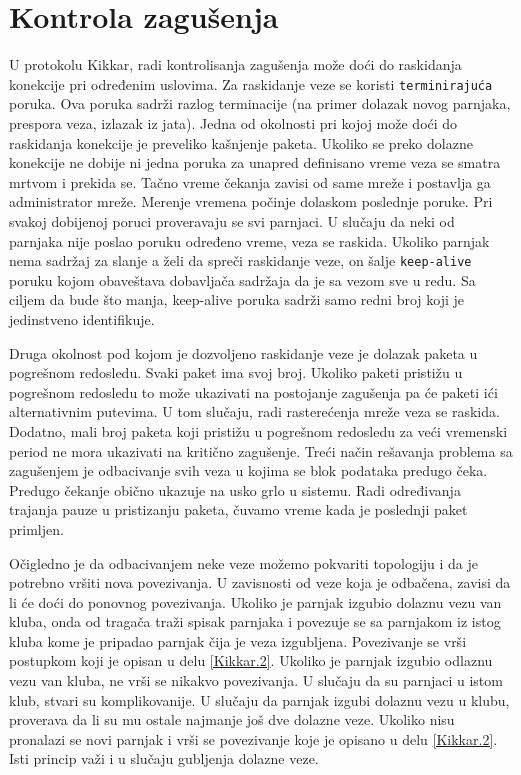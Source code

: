 \documentclass[12pt,oneside]{memoir}
\begin{document}
 
\section{Kontrola zagušenja}
\label{Kikkar.4}

U protokolu Kikkar, radi kontrolisanja zagušenja može doći do raskidanja konekcije pri određenim uslovima. Za raskidanje veze se koristi \texttt{terminirajuća} poruka. Ova poruka sadrži razlog terminacije (na primer dolazak novog parnjaka, prespora veza, izlazak iz jata). Jedna od okolnosti pri kojoj može doći do raskidanja konekcije je preveliko kašnjenje paketa. Ukoliko se preko dolazne konekcije ne dobije ni jedna poruka za unapred definisano vreme veza se smatra mrtvom i prekida se. Tačno vreme čekanja zavisi od same mreže i postavlja ga administrator mreže. Merenje vremena počinje dolaskom poslednje poruke. Pri svakoj dobijenoj poruci proveravaju se svi parnjaci. U slučaju da neki od parnjaka nije poslao poruku određeno vreme, veza se raskida. Ukoliko parnjak nema sadržaj za slanje a želi da spreči raskidanje veze, on šalje \texttt{keep-alive} poruku kojom obaveštava dobavljača sadržaja da je sa vezom sve u redu. Sa ciljem da bude što manja, keep-alive poruka sadrži samo redni broj koji je jedinstveno identifikuje. 

Druga okolnost pod kojom je dozvoljeno raskidanje veze je dolazak paketa u pogrešnom redosledu. Svaki paket ima svoj broj. Ukoliko paketi pristižu u pogrešnom redosledu to može ukazivati na postojanje zagušenja pa će paketi ići alternativnim putevima. U tom slučaju, radi rasterećenja mreže veza se raskida. Dodatno, mali broj paketa koji pristižu u pogrešnom redosledu za veći vremenski period ne mora ukazivati na kritično zagušenje. Treći način rešavanja problema sa zagušenjem je odbacivanje svih veza u kojima se blok podataka predugo čeka. Predugo čekanje obično ukazuje na usko grlo u sistemu. Radi određivanja trajanja pauze u pristizanju paketa, čuvamo vreme kada je poslednji paket primljen.

Očigledno je da odbacivanjem neke veze možemo pokvariti topologiju i da je potrebno vršiti nova povezivanja. U zavisnosti od veze koja je odbačena, zavisi da li će doći do ponovnog povezivanja. Ukoliko je parnjak izgubio dolaznu vezu van kluba, onda od tragača traži spisak parnjaka i povezuje se sa parnjakom iz istog kluba kome je pripadao parnjak čija je veza izgubljena. Povezivanje se vrši postupkom koji je opisan u delu \ref{Kikkar.2}. Ukoliko je parnjak izgubio odlaznu vezu van kluba, ne vrši se nikakvo povezivanja. U slučaju da su parnjaci u istom klub, stvari su komplikovanije. U slučaju da parnjak izgubi dolaznu vezu u klubu, proverava da li su mu ostale najmanje još dve dolazne veze. Ukoliko nisu pronalazi se novi parnjak i vrši se povezivanje koje je opisano u delu \ref{Kikkar.2}. Isti princip važi i u slučaju gubljenja dolazne veze.
\end{document}
